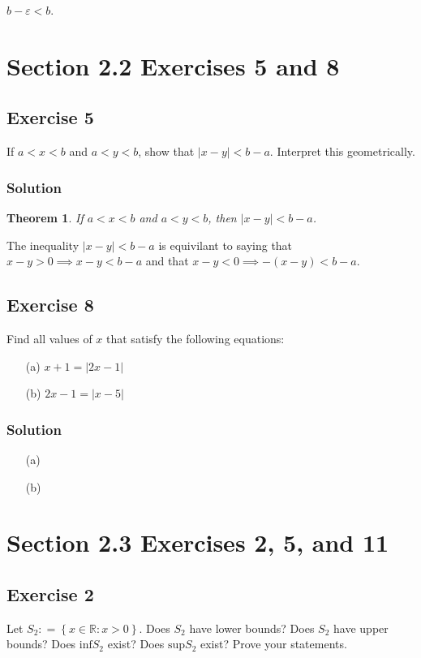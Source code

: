 \documentclass[12pt]{article}
\newtheorem*{thm}{Theorem}
\begin{document}
$b - \varepsilon < b$.

\section*{Section 2.2 Exercises 5 and 8}

\subsection*{Exercise 5}
If $a < x < b$ and $a < y < b$, show that $\left|x - y\right| < b - a$. Interpret this geometrically.

\subsubsection*{Solution}
\begin{thm}
If $a < x < b$ and $a < y < b$, then $\left| x - y \right| < b - a$.
\end{thm}

The inequality $\left| x - y \right| < b - a$ is equivilant to saying that $x - y > 0 \implies x - y < b - a$ and that $x - y < 0 \implies -\left(x - y\right) < b - a$.

\subsection*{Exercise 8}
Find all values of $x$ that satisfy the following equations:
\begin{itemize}
\item[(a)] $x + 1 = \left|2x - 1\right|$
\item[(b)] $2x - 1 = \left|x - 5\right|$
\end{itemize}

\subsubsection*{Solution}
\begin{itemize}
\item[(a)]
\item[(b)]
\end{itemize}

\section*{Section 2.3 Exercises 2, 5, and 11}

\subsection*{Exercise 2}
Let $S_2 \mathrel{\mathop:}= \left\{x \in \mathbb{R} : x > 0\right\}$. Does $S_2$ have lower bounds? Does $S_2$ have upper bounds? Does $\text{inf}S_2$ exist? Does $\text{sup}S_2$ exist? Prove your statements.
\end{document}

